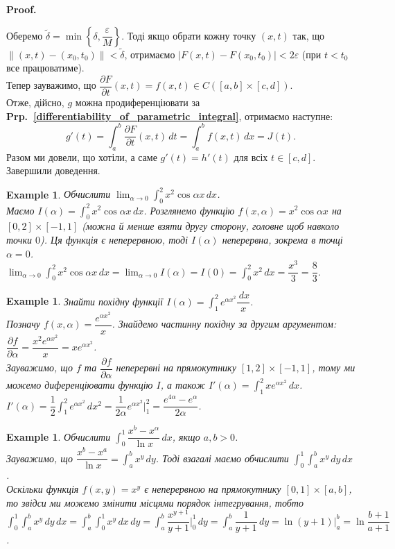 \documentclass[a4paper, 10pt]{article}
\makeatletter
\def\departial#1#2{\dfrac{\partial {#1}}{\partial {#2}}}
\def\huge{\displaystyle}
\theoremstyle{theoremdd}
\theoremstyle{theoremdd}
\theoremstyle{theoremdd}
\theoremstyle{theoremdd}
\theoremstyle{theoremdd}
\newtheorem{example}[theorem]{Example}
\theoremstyle{theoremdd}
\theoremstyle{theoremdd}
\theoremstyle{theoremdd}
\theoremstyle{theoremdd}
\newcommand\prpref[1]{\textbf{Prp.~\ref{#1}}}
\renewenvironment{proof}[1][Proof.\\]{\par
\pushQED{\hfill \qed}%
\normalfont \topsep6\p@\@plus6\p@\relax
\trivlist
\item\relax
{\bfseries
#1\@addpunct{.}}\hspace\labelsep\ignorespaces
}{%
\popQED\endtrivlist\@endpefalse
}
\makeatother
\begin{document}
\begin{proof}
\[\]
Оберемо $\tilde{\delta} = \min\left\{\delta,\dfrac{\varepsilon}{M}\right\}$. Тоді якщо обрати кожну точку $(x,t)$ так, що $\| (x,t) - (x_0,t_0) \| < \tilde{\delta}$, отримаємо $|F(x,t) - F(x_0,t_0)| < 2 \varepsilon$ (при $t < t_0$ все працюватиме).\\
Тепер зауважимо, що $\departial{F}{t}(x,t) = f(x,t) \in C([a,b] \times [c,d])$.\\
Отже, дійсно, $g$ можна продиференціювати за \prpref{differentiability_of_parametric_integral}, отримаємо наступне:
\[
g'(t) = \displaystyle\int_a^b \departial{F}{t}(x,t)\,dt = \int_a^b f(x,t)\,dx = J(t).
\]
Разом ми довели, що хотіли, а саме $g'(t) = h'(t)$ для всіх $t \in [c,d]$. Завершили доведення.
\end{proof}

\begin{example}
Обчислити $\huge \lim_{\alpha \to 0} \int_0^2 x^2 \cos \alpha x \,dx$.\\
Маємо $I(\alpha) = \huge\int_0^2 x^2 \cos \alpha x \,dx$. Розглянемо функцію $f(x,\alpha) = x^2 \cos \alpha x$ на $[0,2] \times [-1,1]$ (можна й менше взяти другу сторону, головне щоб навколо точки $0$). Ця функція є неперервною, тоді $I(\alpha)$ неперервна, зокрема в точці $\alpha = 0$.\\
$\huge \lim_{\alpha \to 0} \int_0^2 x^2 \cos \alpha x \,dx = \lim_{\alpha \to 0} I(\alpha) = I(0) = \int_0^2 x^2 \,dx = \dfrac{x^3}{3} = \dfrac{8}{3}$.
\end{example}

\begin{example}
Знайти похідну функції $I(\alpha) = \huge\int_1^2 e^{\alpha x^2} \dfrac{\,dx}{x}$.\\
Позначу $f(x,\alpha) = \dfrac{e^{\alpha x^2}}{x}$. Знайдемо частинну похідну за другим аргументом: $\departial{f}{\alpha} = \dfrac{x^2 e^{\alpha x^2}}{x} = x e^{\alpha x^2}$.\\
Зауважимо, що $f$ та $\departial{f}{\alpha}$ неперервні на прямокутнику $[1,2] \times [-1,1]$, тому ми можемо диференціювати функцію $I$, а також $I'(\alpha) = \huge\int_1^2 x e^{\alpha x^2}\,dx$.\\
$I'(\alpha) = \huge \dfrac{1}{2} \int_1^2 e^{\alpha x^2}\,dx^2 = \dfrac{1}{2\alpha} e^{\alpha x^2} \Big|_1^2 = \dfrac{e^{4\alpha}-e^{\alpha}}{2\alpha}$.
\end{example}

\begin{example}
Обчислити $\huge\int_0^1 \dfrac{x^b - x^\alpha}{\ln x}\,dx$, якщо $a,b>0$.\\
Зауважимо, що $\dfrac{x^b - x^a}{\ln x} = \huge\int_a^b x^y\,dy$. Тоді взагалі маємо обчислити $\huge\int_0^1 \int_a^b x^y \,dy \,dx$.\\
Оскільки функція $f(x,y) = x^y$ є неперервною на прямокутнику $[0,1] \times [a,b]$, то звідси ми можемо змінити місцями порядок інтегрування, тобто\\
$\huge\int_0^1 \int_a^b x^y \,dy \,dx = \int_a^b \int_0^1 x^y\,dx\,dy = \int_a^b \dfrac{x^{y+1}}{y+1}\Big|_0^1\,dy = \int_a^b \dfrac{1}{y+1}\,dy = \ln (y+1) \Big|_a^b = \ln \dfrac{b+1}{a+1}$.
\end{example}
\end{document}

